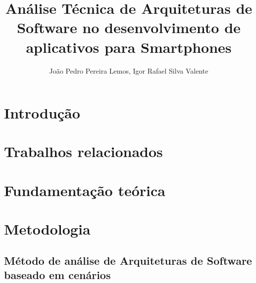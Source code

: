 \documentclass[12pt]{article}
\title{Análise Técnica de Arquiteturas de Software no desenvolvimento de aplicativos para Smartphones}
\author{João Pedro Pereira Lemos\inst{1}, Igor Rafael Silva Valente\inst{1}}
\begin{document}
\maketitle

\begin{abstract}

	

\end{abstract}

\begin{resumo}

	

\end{resumo}

\section{Introdução}





\section{Trabalhos relacionados}







\section{Fundamentação teórica}



\section{Metodologia}



\subsection{Método de análise de Arquiteturas de Software baseado em cenários}


\end{document}
